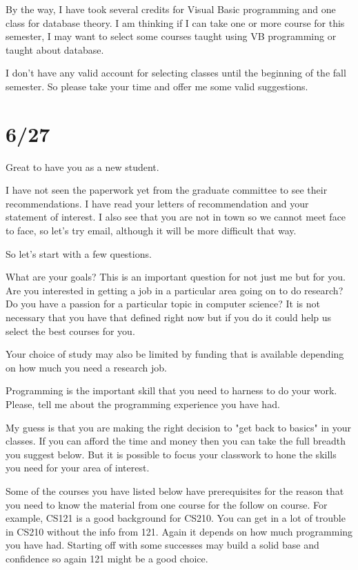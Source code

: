 \documentclass[12pt]{book}
\begin{document}
By the way, I have took several credits for Visual Basic programming and one class for database theory. I am thinking if I can take one or more course for this semester, I may want to select some courses taught using VB programming or taught about database.

I don’t have any valid account for selecting classes until the beginning of the fall semester. So please take your time and offer me some valid suggestions. 

\section{6/27}
\label{sec-2-2}
Great to have you as a new student. 

I have not seen the paperwork yet from the graduate committee to see their recommendations.   I have read your letters of recommendation and your statement of interest.   I also see that you are not in town so we cannot meet face to face, so let's try email, although it will be more difficult that way.

So let's start with a few questions. 

What are your goals?   This is an important question for not just me but for you. Are you interested in getting a job in a particular area going on to do research? Do you have a passion for a particular topic in computer science? It is not necessary that you have that defined right now but if you do it could help us select the best courses for you.

Your choice of study may also be limited by funding that is available depending on how much you need a research job.

Programming is the important skill that you need to harness to do your work. Please, tell me about the programming experience you have had.

My guess is that you are making the right decision to "get back to basics" in your classes.   If you can afford the time and money then you can take the full breadth you suggest below.  But it is possible to focus your classwork to hone the skills you need for your area of interest.   

Some of the courses you have listed below have prerequisites for the reason that you need to know the material from one course for the follow on course.   For example, CS121 is a good background for CS210.   You can get in a lot of trouble in CS210 without the info from 121.   Again it depends on how much programming you have had.   Starting off with some successes may build a solid base and confidence so again 121 might be a good choice.   
\end{document}
